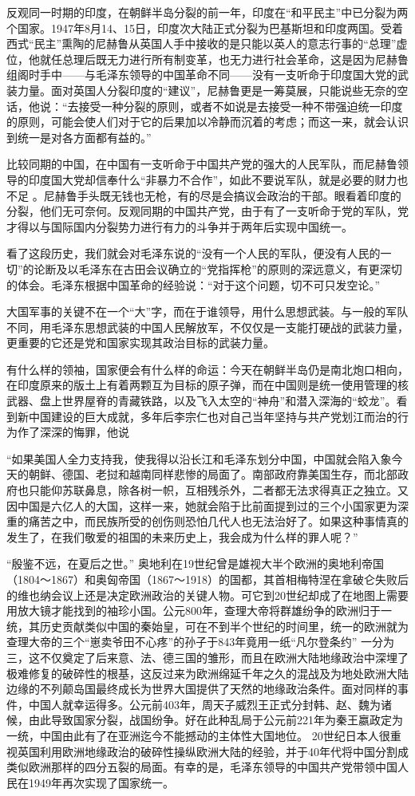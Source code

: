 \documentclass[UTF8, 12pt, a4paper]{ctexrep}
\begin{document}
反观同一时期的印度，在朝鲜半岛分裂的前一年，印度在“和平民主”中已分裂为两个国家。1947年8月14、15日，印度次大陆正式分裂为巴基斯坦和印度两国。受着西式“民主”熏陶的尼赫鲁从英国人手中接收的是只能以英人的意志行事的“总理”虚位，他就任总理后既无力进行所有制变革，也无力进行社会革命，这是因为尼赫鲁组阁时手中——与毛泽东领导的中国革命不同——没有一支听命于印度国大党的武装力量。面对英国人分裂印度的“建议”，尼赫鲁更是一筹莫展，只能说些无奈的空话，他说：“去接受一种分裂的原则，或者不如说是去接受一种不带强迫统一印度的原则，可能会使人们对于它的后果加以冷静而沉着的考虑；而这一来，就会认识到统一是对各方面都有益的。”

比较同期的中国，在中国有一支听命于中国共产党的强大的人民军队，而尼赫鲁领导的印度国大党却信奉什么“非暴力不合作”，如此不要说军队，就是必要的财力也不足 。尼赫鲁手头既无钱也无枪，有的尽是会搞议会政治的干部。眼看着印度的分裂，他们无可奈何。反观同期的中国共产党，由于有了一支听命于党的军队，党才得以与国际国内分裂势力进行有力的斗争并于两年后实现中国统一。

看了这段历史，我们就会对毛泽东说的“没有一个人民的军队，便没有人民的一切”的论断及以毛泽东在古田会议确立的“党指挥枪”的原则的深远意义，有更深切的体会。毛泽东根据中国革命的经验说：“对于这个问题，切不可只发空论。”

大国军事的关键不在一个“大”字，而在于谁领导，用什么思想武装。与一般的军队不同，用毛泽东思想武装的中国人民解放军，不仅仅是一支能打硬战的武装力量，更重要的它还是党和国家实现其政治目标的武装力量。

有什么样的领袖，国家便会有什么样的命运：今天在朝鲜半岛仍是南北炮口相向，在印度原来的版土上有着两颗互为目标的原子弹，而在中国则是统一使用管理的核武器、盘上世界屋脊的青藏铁路，以及飞入太空的“神舟”和潜入深海的“蛟龙”。看到新中国建设的巨大成就，多年后李宗仁也对自己当年坚持与共产党划江而治的行为作了深深的悔罪，他说

“如果美国人全力支持我，使我得以沿长江和毛泽东划分中国，中国就会陷入象今天的朝鲜、德国、老挝和越南同样悲惨的局面了。南部政府靠美国生存，而北部政府也只能仰苏联鼻息，除各树一帜，互相残杀外，二者都无法求得真正之独立。又因中国是六亿人的大国，这样一来，她就会陷于比前面提到过的三个小国家更为深重的痛苦之中，而民族所受的创伤则恐怕几代人也无法治好了。如果这种事情真的发生了，在我们敬爱的祖国的未来历史上，我会成为什么样的罪人呢？”

“殷鉴不远，在夏后之世。” 奥地利在19世纪曾是雄视大半个欧洲的奥地利帝国（1804～1867）和奥匈帝国（1867～1918）的国都，其首相梅特涅在拿破仑失败后的维也纳会议上还是决定欧洲政治的关键人物。可它到20世纪却成了在地图上需要用放大镜才能找到的袖珍小国。公元800年，查理大帝将群雄纷争的欧洲归于一统，其历史贡献类似中国的秦始皇，可在不到半个世纪的时间里，统一的欧洲就为查理大帝的三个“崽卖爷田不心疼”的孙子于843年竟用一纸“凡尔登条约” 一分为三，这不仅奠定了后来意、法、德三国的雏形，而且在欧洲大陆地缘政治中深埋了极难修复的破碎性的根基，这反过来为欧洲绵延千年之久的混战及为地处欧洲大陆边缘的不列颠岛国最终成长为世界大国提供了天然的地缘政治条件。面对同样的事件，中国人就幸运得多。公元前403年，周天子威烈王正式分封韩、赵、魏为诸候，由此导致国家分裂，战国纷争。好在此种乱局于公元前221年为秦王嬴政定为一统，中国由此有了在亚洲迄今不能撼动的主体性大国地位。 20世纪日本人很重视英国利用欧洲地缘政治的破碎性操纵欧洲大陆的经验，并于40年代将中国分割成类似欧洲那样的四分五裂的局面。有幸的是，毛泽东领导的中国共产党带领中国人民在1949年再次实现了国家统一。
\end{document}
